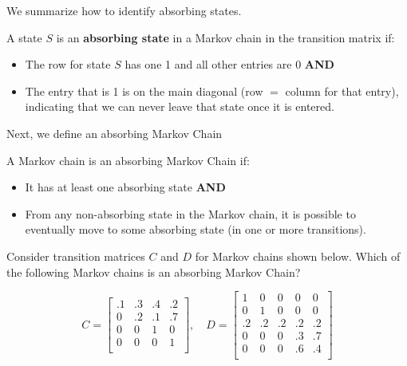 We summarize how to identify absorbing states.

\begin{definition}
    A state \(S\) is an \textbf{absorbing state} in a Markov chain in the transition matrix if:
    \begin{itemize}
        \item The row for state \(S\) has one 1 and all other entries are 0 \textbf{AND}
        \item The entry that is 1 is on the main diagonal (row \(=\) column for that entry), indicating that we can never leave that state once it is entered.
    \end{itemize}
\end{definition}

Next, we define an absorbing Markov Chain

\begin{definition}
    A Markov chain is an absorbing Markov Chain if:
    \begin{itemize}
        \item It has at least one absorbing state \textbf{AND}
        \item From any non-absorbing state in the Markov chain, it is possible to eventually move to some absorbing state (in one or more transitions).
    \end{itemize}
\end{definition}

\begin{example}
    Consider transition matrices \( C \) and \( D \) for Markov chains shown below. Which of the following Markov chains is an absorbing Markov Chain?

    \[
        C = \begin{bmatrix}
            .1 & .3 & .4 & .2 \\
            0  & .2 & .1 & .7 \\
            0  & 0  & 1  & 0  \\
            0  & 0  & 0  & 1  \\
        \end{bmatrix}, \quad
        D = \begin{bmatrix}
            1  & 0  & 0  & 0  & 0  \\
            0  & 1  & 0  & 0  & 0  \\
            .2 & .2 & .2 & .2 & .2 \\
            0  & 0  & 0  & .3 & .7 \\
            0  & 0  & 0  & .6 & .4 \\
        \end{bmatrix}
    \]
\end{example}

